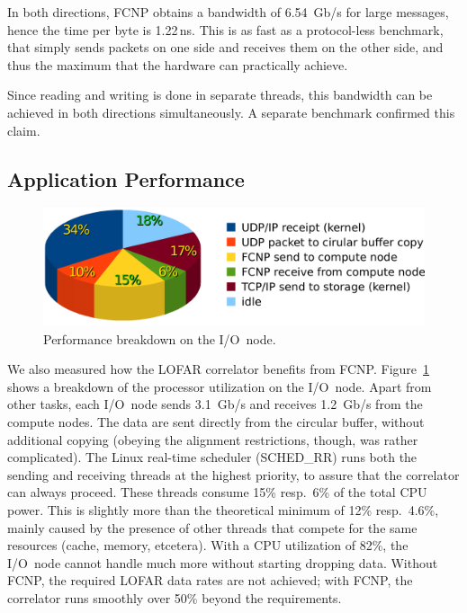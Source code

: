 \documentclass[conference]{worldcomp}
\newcommand{\ns}{\,ns\xspace}
\begin{document}
In both directions, FCNP obtains a bandwidth of 6.54~Gb/s for large messages,
hence the time per byte is 1.22\ns.
This is as fast as a protocol-less benchmark, that simply sends packets
on one side and receives them on the other side, and thus the maximum that
the hardware can practically achieve.

Since reading and writing is done in separate threads,
this bandwidth can be achieved in both directions simultaneously.
A separate benchmark confirmed this claim.




\subsection{Application Performance}

\begin{figure}[h]
\includegraphics[width=\columnwidth]{ionode-load.pdf}
\caption{Performance breakdown on the I/O~node.}
\label{fig:ionode-load}
\end{figure}

We also measured how the LOFAR correlator benefits from FCNP.
Figure~\ref{fig:ionode-load} shows a breakdown of the processor
utilization on the I/O~node.
Apart from other tasks, each I/O~node sends 3.1~Gb/s and receives 1.2~Gb/s
from the compute nodes.
The data are sent directly from the circular buffer, without additional
copying (obeying the alignment restrictions, though, was rather complicated).
The Linux real-time scheduler (SCHED\_RR) runs both the sending and receiving
threads at the highest priority, to assure that the correlator can always
proceed.
These threads consume 15\% resp.\ 6\% of the total CPU power.
This is slightly more than the theoretical minimum of 12\% resp.\ 4.6\%,
mainly caused by the presence of other threads that compete for the same
resources (cache, memory, etcetera).
With a CPU utilization of 82\%, the I/O~node cannot handle much more without
starting dropping data.
Without FCNP, the required LOFAR data rates are not achieved;
with FCNP, the correlator runs smoothly over 50\% beyond the requirements.
\end{document}
